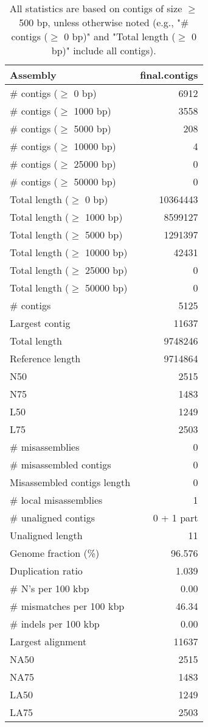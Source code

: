 \documentclass[12pt,a4paper]{article}
\begin{document}
\begin{table}[ht]
\begin{center}
\caption{All statistics are based on contigs of size $\geq$ 500 bp, unless otherwise noted (e.g., "\# contigs ($\geq$ 0 bp)" and "Total length ($\geq$ 0 bp)" include all contigs).}
\begin{tabular}{|l*{1}{|r}|}
\hline
Assembly & final.contigs \\ \hline
\# contigs ($\geq$ 0 bp) & 6912 \\ \hline
\# contigs ($\geq$ 1000 bp) & 3558 \\ \hline
\# contigs ($\geq$ 5000 bp) & 208 \\ \hline
\# contigs ($\geq$ 10000 bp) & 4 \\ \hline
\# contigs ($\geq$ 25000 bp) & 0 \\ \hline
\# contigs ($\geq$ 50000 bp) & 0 \\ \hline
Total length ($\geq$ 0 bp) & 10364443 \\ \hline
Total length ($\geq$ 1000 bp) & 8599127 \\ \hline
Total length ($\geq$ 5000 bp) & 1291397 \\ \hline
Total length ($\geq$ 10000 bp) & 42431 \\ \hline
Total length ($\geq$ 25000 bp) & 0 \\ \hline
Total length ($\geq$ 50000 bp) & 0 \\ \hline
\# contigs & 5125 \\ \hline
Largest contig & 11637 \\ \hline
Total length & 9748246 \\ \hline
Reference length & 9714864 \\ \hline
N50 & 2515 \\ \hline
N75 & 1483 \\ \hline
L50 & 1249 \\ \hline
L75 & 2503 \\ \hline
\# misassemblies & 0 \\ \hline
\# misassembled contigs & 0 \\ \hline
Misassembled contigs length & 0 \\ \hline
\# local misassemblies & 1 \\ \hline
\# unaligned contigs & 0 + 1 part \\ \hline
Unaligned length & 11 \\ \hline
Genome fraction (\%) & 96.576 \\ \hline
Duplication ratio & 1.039 \\ \hline
\# N's per 100 kbp & 0.00 \\ \hline
\# mismatches per 100 kbp & 46.34 \\ \hline
\# indels per 100 kbp & 0.00 \\ \hline
Largest alignment & 11637 \\ \hline
NA50 & 2515 \\ \hline
NA75 & 1483 \\ \hline
LA50 & 1249 \\ \hline
LA75 & 2503 \\ \hline
\end{tabular}
\end{center}
\end{table}
\end{document}
